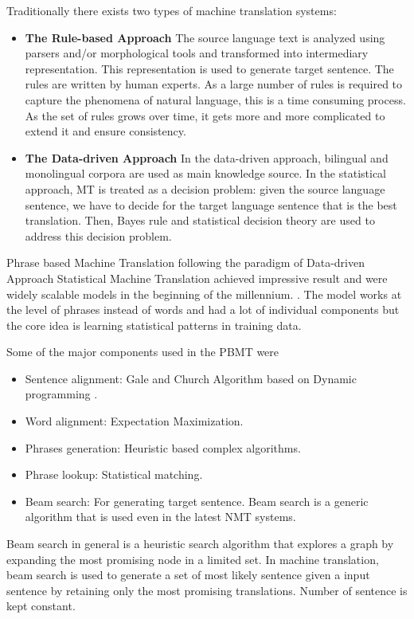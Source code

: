 \documentclass[conference]{IEEEtran}
\begin{document}
Traditionally there exists two types of machine translation systems:
\begin{itemize}
 \item \textbf{The Rule-based Approach}
The source language text is analyzed using parsers and/or
morphological tools and transformed into intermediary representation. This
representation is used to generate target sentence. The rules are written by
human experts. As a large number of rules is required to capture the phenomena of
natural language, this is a time consuming process. As the set of rules grows over
time, it gets more and more complicated to extend it and ensure consistency.
\item \textbf{The Data-driven Approach}
In the data-driven approach, bilingual and monolingual corpora are used as main
knowledge source. In the statistical approach, MT is treated as a decision problem: given
the source language sentence, we have to decide for the target language sentence
that is the best translation. Then, Bayes rule and statistical decision theory are
used to address this decision problem.
\end{itemize}


Phrase based Machine Translation following the paradigm of Data-driven Approach  Statistical Machine Translation achieved impressive result and were widely scalable models in the beginning of the millennium.  \cite{koehn2003statistical}. The model works at the level of phrases instead of words and had a lot of individual components but the core idea is learning statistical patterns in training data.

Some of the major components used in the PBMT were
\begin{itemize}
 
 \item  Sentence alignment: Gale and Church Algorithm based on Dynamic programming \cite{lewis1994sequential}.
 \item  Word alignment: Expectation Maximization.
 \item  Phrases generation: Heuristic based complex algorithms.
 \item  Phrase lookup: Statistical matching.
 \item  Beam search: For generating target sentence. Beam search is a generic algorithm that is used even in the latest NMT systems.
\end{itemize}
 Beam search in general is a heuristic search algorithm that explores a graph by expanding the most promising node in a limited set. In machine translation, beam search is used to generate a set of most likely sentence given a input sentence by retaining only the most promising translations. Number of sentence is kept constant.  
\end{document}
